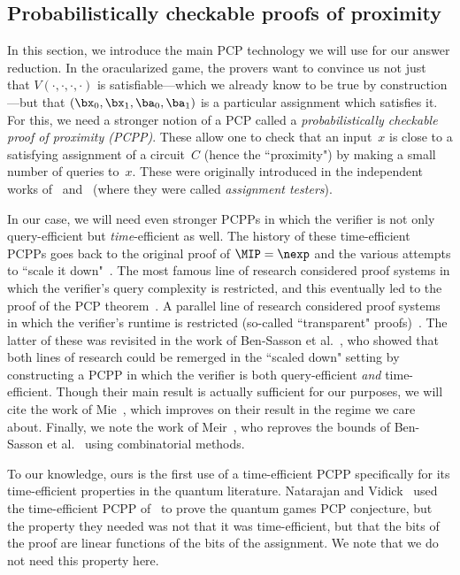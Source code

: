 \documentclass[11pt]{article}
\begin{document}
\subsection{Probabilistically checkable proofs of proximity}

In this section, we introduce the main PCP technology we will use for our answer reduction.
In the oracularized game,
the provers want to convince us not just that $V(\cdot, \cdot, \cdot, \cdot)$
is satisfiable---which we already know to be true by construction---but that $(\bx_0, \bx_1, \ba_0, \ba_1)$
is a particular assignment which satisfies it.
For this, we need a stronger notion of a PCP called a \emph{probabilistically checkable proof of proximity (PCPP)}.
These allow one to check that an input~$x$ is close to a satisfying assignment of a circuit~$C$ (hence the ``proximity")
by making a small number of queries to~$x$.
These were originally introduced in the independent works of~\cite{BGH+06}
and~\cite{DR06} (where they were called \emph{assignment testers}).

In our case, we will need even stronger PCPPs in which the verifier is not only query-efficient but \emph{time}-efficient as well.
The history of these time-efficient PCPPs goes back to the original proof of $\MIP = \nexp$ and the various attempts to ``scale it down"~\cite{OD05}.
The most famous line of research considered proof systems in which the verifier's query complexity is restricted,
and this eventually led to the proof of the PCP theorem~\cite{AS98,ALM+98}.
A parallel line of research considered proof systems in which the verifier's runtime is restricted (so-called ``transparent" proofs)~\cite{BFLS91}.
The latter of these was revisited in the work of Ben-Sasson et al.~\cite{BGH+05},
who showed that both lines of research could be remerged in the ``scaled down" setting
by constructing a PCPP in which the verifier is both query-efficient \emph{and} time-efficient.
Though their main result is actually sufficient for our purposes,
we will cite the work of Mie~\cite{Mie09}, which improves on their result in the regime we care about.
Finally, we note the work of Meir~\cite{Mei14}, who reproves the bounds of Ben-Sasson et al.~\cite{BGH+05} using combinatorial methods.

To our knowledge, ours is the first use of a time-efficient PCPP specifically for its time-efficient properties in the quantum literature.
Natarajan and Vidick~\cite{NV18a} used the time-efficient PCPP of~\cite{BGH+05} to prove the quantum games PCP conjecture,
but the property they needed was not that it was time-efficient,
but that the bits of the proof are linear functions of the bits of the assignment.
We note that we do not need this property here.
\end{document}
